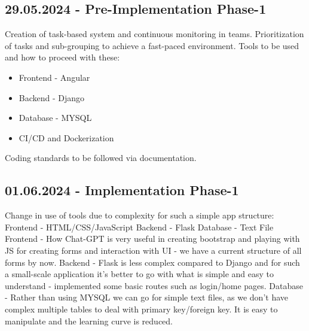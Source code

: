 \subsection*{29.05.2024 - Pre-Implementation Phase-1}
    Creation of task-based system and continuous monitoring in teams.
    Prioritization of tasks and sub-grouping to achieve a fast-paced environment.
    Tools to be used and how to proceed with these:
    \begin{itemize}
        \item Frontend - Angular\newline
        \item Backend - Django\newline
        \item Database - MYSQL\newline
        \item CI/CD and Dockerization
    \end{itemize}
    Coding standards to be followed via documentation.

\subsection*{01.06.2024 - Implementation Phase-1}
    Change in use of tools due to complexity for such a simple app structure:\newline
        Frontend - HTML/CSS/JavaScript\newline
        Backend - Flask\newline
        Database - Text File
    Frontend - How Chat-GPT is very useful in creating bootstrap and playing with JS for creating forms and interaction with UI - we have a current structure of all forms by now.\newline
    Backend - Flask is less complex compared to Django and for such a small-scale application it’s better to go with what is simple and easy to understand - implemented some basic routes such as login/home pages.\newline
    Database - Rather than using MYSQL we can go for simple text files, as we don’t have complex multiple tables to deal with primary key/foreign key. It is easy to manipulate and the learning curve is reduced.

